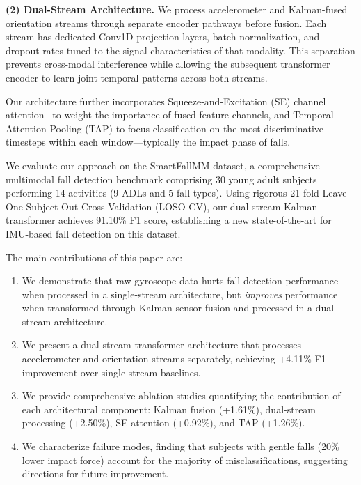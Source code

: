 \documentclass[journal,article,submit,pdftex,moreauthors]{Definitions/mdpi}
\begin{document}
\textbf{(2) Dual-Stream Architecture.} We process accelerometer and Kalman-fused orientation streams through separate encoder pathways before fusion. Each stream has dedicated Conv1D projection layers, batch normalization, and dropout rates tuned to the signal characteristics of that modality. This separation prevents cross-modal interference while allowing the subsequent transformer encoder to learn joint temporal patterns across both streams.

Our architecture further incorporates Squeeze-and-Excitation (SE) channel attention~\cite{hu2018squeeze} to weight the importance of fused feature channels, and Temporal Attention Pooling (TAP) to focus classification on the most discriminative timesteps within each window---typically the impact phase of falls.

We evaluate our approach on the SmartFallMM dataset, a comprehensive multimodal fall detection benchmark comprising 30 young adult subjects performing 14 activities (9 ADLs and 5 fall types). Using rigorous 21-fold Leave-One-Subject-Out Cross-Validation (LOSO-CV), our dual-stream Kalman transformer achieves 91.10\% F1 score, establishing a new state-of-the-art for IMU-based fall detection on this dataset.

The main contributions of this paper are:
\begin{enumerate}
    \item We demonstrate that raw gyroscope data hurts fall detection performance when processed in a single-stream architecture, but \textit{improves} performance when transformed through Kalman sensor fusion and processed in a dual-stream architecture.

    \item We present a dual-stream transformer architecture that processes accelerometer and orientation streams separately, achieving +4.11\% F1 improvement over single-stream baselines.

    \item We provide comprehensive ablation studies quantifying the contribution of each architectural component: Kalman fusion (+1.61\%), dual-stream processing (+2.50\%), SE attention (+0.92\%), and TAP (+1.26\%).

    \item We characterize failure modes, finding that subjects with gentle falls (20\% lower impact force) account for the majority of misclassifications, suggesting directions for future improvement.
\end{enumerate}
\end{document}
